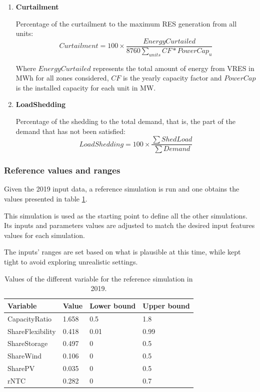 \begin{enumerate}
    \item \textbf{Curtailment}

    Percentage of the curtailment to the maximum RES generation from all units:
    \begin{equation}
        Curtailment = 100\times \frac{EnergyCurtailed}{8760\sum_{units} CF * PowerCap_u}
    \end{equation}

    Where $EnergyCurtailed$ represents the total amount of energy from VRES in MWh for all zones considered, $CF$ is the yearly capacity factor and $PowerCap$ is the installed capacity for each unit in MW.

    \item \textbf{LoadShedding}

    Percentage of the shedding to the total demand, that is, the part of the demand that has not been satisfied:
    \begin{equation}
        LoadShedding = 100\times \frac{\sum ShedLoad}{\sum Demand}
    \end{equation}
\end{enumerate}


\subsubsection{Reference values and ranges}

Given the 2019 input data, a reference simulation is run and one obtains the values presented in table \ref{table:reference-values}.

This simulation is used as the starting point to define all the other simulations. Its inputs and parameters values are adjusted to match the desired input features values for each simulation.

The inputs' ranges are set based on what is plausible at this time, while kept tight to avoid exploring unrealistic settings.

\begin{table}[h]
    \centering
    \begin{tabular}{|l l l l|}
        \hline
        Variable         & Value  & Lower bound & Upper bound \\ \hline
        CapacityRatio    & 1.658  & 0.5         & 1.8         \\
        ShareFlexibility & 0.418  & 0.01        & 0.99        \\
        ShareStorage     & 0.497  & 0           & 0.5         \\
        ShareWind        & 0.106  & 0           & 0.5         \\
        SharePV          & 0.035  & 0           & 0.5         \\
        rNTC             & 0.282  & 0           & 0.7         \\ \hline
    \end{tabular}
    \caption{Values of the different variable for the reference simulation in 2019.}
    \label{table:reference-values}
\end{table}

